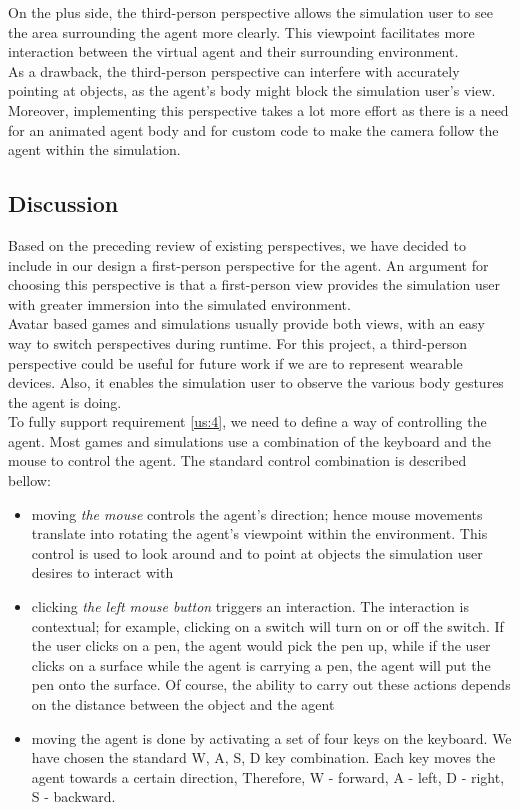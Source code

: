 On the plus side, the third-person perspective allows the simulation user to see the area surrounding the agent more clearly. This viewpoint facilitates more interaction between the virtual agent and their surrounding environment.\\

As a drawback, the third-person perspective can interfere with accurately pointing at objects, as the agent's body might block the simulation user's view. Moreover, implementing this perspective takes a lot more effort as there is a need for an animated agent body and for custom code to make the camera follow the agent within the simulation.\\

\subsection{Discussion}\label{subsec:agent_discussion}
Based on the preceding review of existing perspectives, we have decided to include in our design a first-person perspective for the agent. An argument for choosing this perspective is that a first-person view provides the simulation user with greater immersion into the simulated environment.\\

Avatar based games and simulations usually provide both views, with an easy way to switch perspectives during runtime. For this project, a third-person perspective could be useful for future work if we are to represent wearable devices. Also, it enables the simulation user to observe the various body gestures the agent is doing.\\

To fully support requirement \ref{us:4}, we need to define a way of controlling the agent. Most games and simulations use a combination of the keyboard and the mouse to control the agent. The standard control combination is described bellow:
\begin{itemize}
	\item moving \emph{the mouse} controls the agent's direction; hence mouse movements translate into rotating the agent's viewpoint within the environment. This control is used to look around and to point at objects the simulation user desires to interact with
	\item clicking \emph{the left mouse button} triggers an interaction. The interaction is contextual; for example, clicking on a switch will turn on or off the switch. If the user clicks on a pen, the agent would pick the pen up, while if the user clicks on a surface while the agent is carrying a pen, the agent will put the pen onto the surface. Of course, the ability to carry out these actions depends on the distance between the object and the agent
	\item moving the agent is done by activating a set of four keys on the keyboard. We have chosen the standard W, A, S, D key combination. Each key moves the agent towards a certain direction, Therefore, W - forward, A - left, D - right, S - backward.
\end{itemize}

